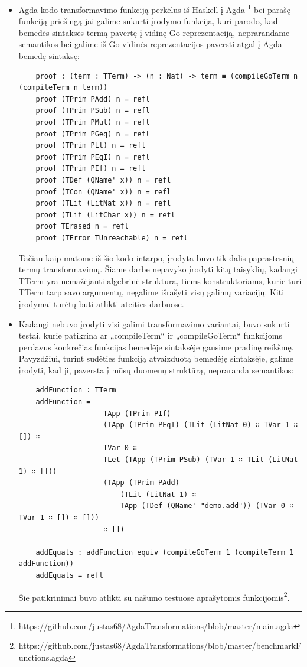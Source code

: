 \documentclass{VUMIFPSbakalaurinis}
\begin{document}
	 \begin{itemize}
		\item Agda kodo transformavimo funkciją perkėlus iš Haskell į Agda \footnote{https://github.com/justas68/AgdaTransformations/blob/master/main.agda} bei parašę funkciją priešingą jai galime sukurti įrodymo funkcija, kuri parodo, kad bemedės sintaksės termą pavertę į vidinę Go reprezentaciją, neprarandame semantikos bei galime iš Go vidinės reprezentacijos paversti atgal į Agda bemedę sintaksę:
\begin{lstlisting}
	proof : (term : TTerm) -> (n : Nat) -> term ≡ (compileGoTerm n (compileTerm n term)) 
	proof (TPrim PAdd) n = refl
	proof (TPrim PSub) n = refl
	proof (TPrim PMul) n = refl
	proof (TPrim PGeq) n = refl
	proof (TPrim PLt) n = refl
	proof (TPrim PEqI) n = refl
	proof (TPrim PIf) n = refl
	proof (TDef (QName' x)) n = refl
	proof (TCon (QName' x)) n = refl
	proof (TLit (LitNat x)) n = refl
	proof (TLit (LitChar x)) n = refl
	proof TErased n = refl
	proof (TError TUnreachable) n = refl
		\end{lstlisting}
		Tačiau kaip matome iš šio kodo intarpo, įrodyta buvo tik dalis paprastesnių termų transformavimų. Šiame darbe nepavyko įrodyti kitų taisyklių, kadangi TTerm yra nemažėjanti algebrinė struktūra, tiems konstruktoriams, kurie turi TTerm tarp savo argumentų, negalime išrašyti visų galimų variacijų. Kiti įrodymai turėtų būti atlikti ateities darbuose.
		\item Kadangi nebuvo įrodyti visi galimi transformavimo variantai, buvo sukurti testai, kurie patikrina ar „compileTerm“ ir „compileGoTerm“ funkcijoms perdavus konkrečias funkcijas bemedėje sintaksėje gausime pradinę reikšmę. Pavyzdžiui, turint sudėties funkciją atvaizduotą bemedėję sintaksėje, galime įrodyti, kad ji, paversta į mūsų duomenų struktūrą, nepraranda semantikos:
\begin{lstlisting}
	addFunction : TTerm
	addFunction = 
					TApp (TPrim PIf)
					(TApp (TPrim PEqI) (TLit (LitNat 0) ∷ TVar 1 ∷ []) ∷
					TVar 0 ∷
					TLet (TApp (TPrim PSub) (TVar 1 ∷ TLit (LitNat 1) ∷ []))
					(TApp (TPrim PAdd)
						(TLit (LitNat 1) ∷
						TApp (TDef (QName' "demo.add")) (TVar 0 ∷ TVar 1 ∷ []) ∷ []))
					∷ [])
	
	addEquals : addFunction equiv (compileGoTerm 1 (compileTerm 1 addFunction))
	addEquals = refl
		\end{lstlisting}
		Šie patikrinimai buvo atlikti su našumo testuose aprašytomis funkcijomis\footnote{https://github.com/justas68/AgdaTransformations/blob/master/benchmarkFunctions.agda}.
	\end{itemize}
\end{document}
